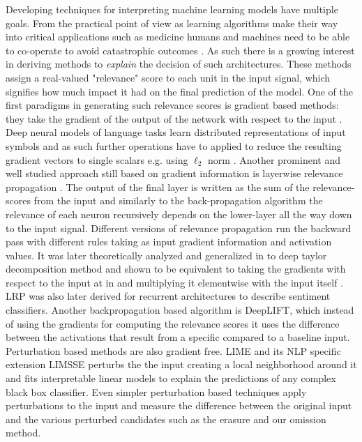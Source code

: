 Developing techniques for interpreting machine learning models have multiple goals.
From the practical point of view as learning algorithms make their way into critical applications
such as medicine humans and machines need to be able to co-operate to avoid catastrophic
outcomes \cite{caruana2015intelligible}. As such there is a growing interest in deriving methods
to \emph{explain} the decision of such architectures.
These methods assign a real-valued "relevance" score to each unit in the input signal,
which signifies how much impact it had on the final prediction of the model.
One of the first paradigms in generating such relevance scores is gradient based methods:
they take the gradient of the output of the network with respect to the input \cite{simonyan2013deep}.
Deep neural models of language tasks learn distributed representations of input symbols
 and as such further operations have to applied to reduce the resulting gradient vectors to
single scalars e.g. using $\ell_2$ norm \cite{bansal2016ask}. Another prominent and well studied
approach still based on gradient information is layerwise
relevance propagation \cite{bach2015pixel}. The output of the final layer
is written as the sum of the relevance-scores from the input and similarly to the back-propagation
algorithm the relevance of each neuron
recursively depends on the lower-layer all the way down to the input signal.
Different versions of relevance propagation run the backward pass with different rules taking as
input gradient information and activation values. It was later theoretically analyzed and generalized
in to deep taylor decomposition method \cite{binder2016layer} and shown to be equivalent to taking the
gradients with respect to the input at in \citep{simonyan2013deep} and multiplying it elementwise
with the input itself \cite{shrikumar2017learning}.
LRP was also later derived for recurrent architectures \cite{arras2017explaining} to describe
sentiment classifiers. Another backpropagation based algorithm is DeepLIFT, which instead of
using the gradients for computing the relevance scores it uses the difference between the activations
that result from a specific compared  to a baseline input.
Perturbation based methods are also gradient free.
LIME \cite{ribeiro2016should} and its NLP specific extension LIMSSE \cite{poerner2018evaluating} perturbs the
the input creating a local neighborhood around it and fits interpretable linear models to explain
the predictions of any complex black box classifier.
Even simpler perturbation based techniques apply perturbations to the input and measure the
difference between the original input and the various perturbed candidates such as the erasure
\cite{li2016understanding} and our omission \cite{Kadar2016} method.

